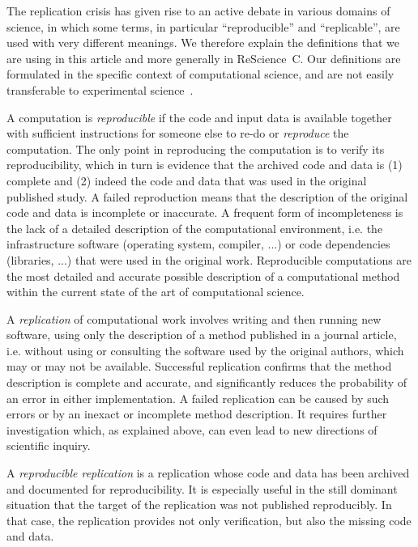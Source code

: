 \documentclass[runningheads]{llncs}
\begin{document}
The replication crisis has given rise to an active debate in various domains of science, in which some terms, in particular ``reproducible'' and ``replicable'', are used with very different meanings. We therefore explain the definitions that we are using in this article and more generally in ReScience~C. Our definitions are formulated in the specific context of computational science, and are not easily transferable to experimental science~\cite{HinsenScientificsoftwaredifferent2018}.

A computation is \textit{reproducible} if the code and input data is available together with sufficient instructions for someone else to re-do or \textit{reproduce} the computation. The only point in reproducing the computation is to verify its reproducibility, which in turn is evidence that the archived code and data is (1) complete and (2) indeed the code and data that was used in the original published study. A failed reproduction means that the description of the original code and data is incomplete or inaccurate. A frequent form of incompleteness is the lack of a detailed description of the computational environment, i.e. the infrastructure software (operating system, compiler, ...) or code dependencies (libraries, ...) that were used in the original work. Reproducible computations are the most detailed and accurate possible description of a computational method within the current state of the art of computational science.

A \textit{replication} of computational work involves writing and then running new software, using only the description of a method published in a journal article, i.e. without using or consulting the software used by the original authors, which may or may not be available. Successful replication confirms that the method description is complete and accurate, and significantly reduces the probability of an error in either implementation. A failed replication can be caused by such errors or by an inexact or incomplete method description. It requires further investigation which, as explained above, can even lead to new directions of scientific inquiry.

A \textit{reproducible replication} is a replication whose code and data has been archived and documented for reproducibility. It is especially useful in the still dominant situation that the target of the replication was not published reproducibly. In that case, the replication provides not only verification, but also the missing code and data.
\end{document}
